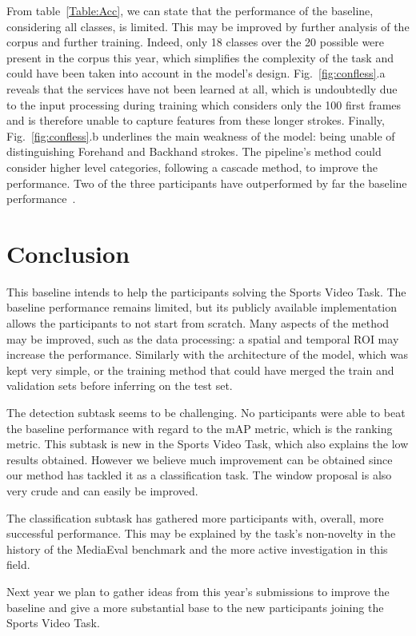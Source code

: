 \documentclass[sigconf]{acmart-me}
\begin{document}
From table~\ref{Table:Acc}, we can state that the performance of the baseline, considering all classes, is limited. This may be improved by further analysis of the corpus and further training. Indeed, only 18 classes over the 20 possible were present in the corpus this year, which simplifies the complexity of the task and could have been taken into account in the model's design. Fig.~\ref{fig:confless}.a reveals that the services have not been learned at all, which is undoubtedly due to the input processing during training which considers only the 100 first frames and is therefore unable to capture features from these longer strokes. Finally, Fig.~\ref{fig:confless}.b underlines the main weakness of the model: being unable of distinguishing Forehand and Backhand strokes. The pipeline's method could consider higher level categories, following a cascade method, to improve the performance. Two of the three participants have outperformed by far the baseline performance~\cite{mediaeval21/transformer, mediaeval21/hcmus}.
\vspace{-5pt}
\section{Conclusion}
\label{sec:discussion}

This baseline intends to help the participants solving the Sports Video Task. The baseline performance remains limited, but its publicly available implementation allows the participants to not start from scratch. Many aspects of the method may be improved, such as the data processing: a spatial and temporal ROI may increase the performance. Similarly with the architecture of the model, which was kept very simple, or the training method that could have merged the train and validation sets before inferring on the test set.
\par
The detection subtask seems to be challenging. No participants were able to beat the baseline performance with regard to the mAP metric, which is the ranking metric. This subtask is new in the Sports Video Task, which also explains the low results obtained. However we believe much improvement can be obtained since our method has tackled it as a classification task. The window proposal is also very crude and can easily be improved. 
\par
The classification subtask has gathered more participants with, overall, more successful performance. This may be explained by the task's non-novelty in the history of the MediaEval benchmark and the more active investigation in this field.
\par
Next year we plan to gather ideas from this year's submissions to improve the baseline and give a more substantial base to the new participants joining the Sports Video Task.


 
\end{document}
